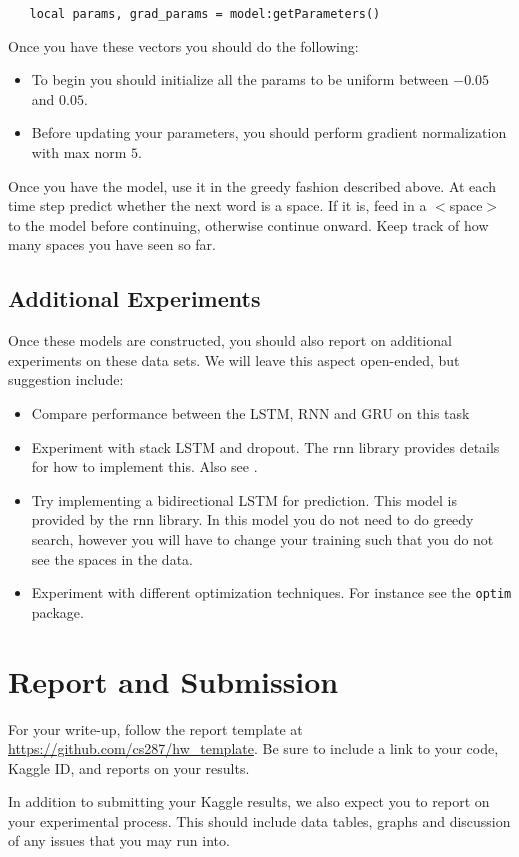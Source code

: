 \documentclass[11pt]{article}
\begin{document}
\begin{lstlisting}
   local params, grad_params = model:getParameters()
\end{lstlisting}

Once you have these vectors you should do the following:
\begin{itemize}
\item To begin you should initialize all the params to be uniform between $-0.05$ and $0.05$.
\item Before updating your parameters, you should perform gradient normalization with max norm $5$.
\end{itemize}

Once you have the model, use it in the greedy fashion described above. 
At each time step predict whether the next word is a space. If it is, feed 
in a $<$space$>$ to the model before continuing, otherwise continue onward. 
Keep track of how many spaces you have seen so far. 

\subsection{Additional Experiments}

Once these models are constructed, you should also report on
additional experiments on these data sets. We will leave this aspect
open-ended, but suggestion include:

\begin{itemize}
\item Compare performance between the LSTM, RNN and GRU on this task

\item Experiment with stack LSTM and dropout. The rnn library provides details for how to implement this. Also see \cite{}. 
\item Try implementing a bidirectional LSTM for prediction. This model is provided by the rnn library. In this model you do not need to do greedy search, however you will 
  have to change your training such that you do not see the spaces in the data.
\item Experiment with different optimization techniques. For instance see the \texttt{optim} package. 

\end{itemize}

\section{Report and Submission}

For your write-up, follow the report template at
\url{https://github.com/cs287/hw_template}. Be sure to include a link
to your code, Kaggle ID, and reports on your results.

In addition to submitting your Kaggle results, we also expect you to report on your 
experimental process. This should include data tables, graphs and discussion of any 
issues that you may run into. 

 

\end{document}
